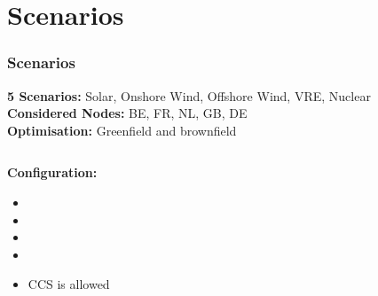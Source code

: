 \documentclass[aspectratio=169]{beamer}
\begin{document}
\section{Scenarios}
\begin{frame}[fragile]
  \frametitle{Scenarios}

  \textbf{5 Scenarios:} Solar, Onshore Wind, Offshore Wind, VRE, Nuclear \\
  \textbf{Considered Nodes:} BE, FR, NL, GB, DE \\
  
  \textbf{Optimisation:} Greenfield and brownfield

  \vspace{1em} %

  \begin{columns}
    \begin{column}{0.5\textwidth}
      \textbf{Configuration:}
      \begin{itemize}
         \item {}
        \item {}
        \item {}
        \item {}
        \item CCS is allowed
      \end{itemize}
    \end{column}

    \begin{column}{0.5\textwidth}
    \end{column}
  \end{columns}
\end{frame}



\end{document}
